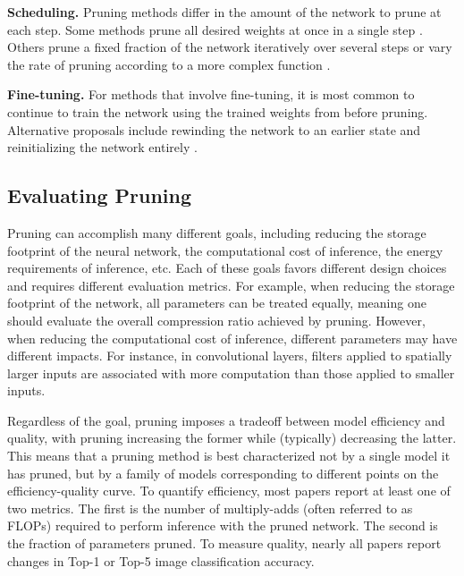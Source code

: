\textbf{Scheduling.}
Pruning methods differ in the amount of the network to prune at each step.
Some methods prune all desired weights at once in a single step \cite{rethinking-net-pruning}.
Others prune a fixed fraction of the network iteratively over several steps \cite{learning-both} or vary the rate of pruning according to a more complex function \cite{google-state-of-sparsity}.

\textbf{Fine-tuning.}
For methods that involve fine-tuning, it is most common to continue to train the network using the trained weights from before pruning.
Alternative proposals include rewinding the network to  an earlier state \cite{lottery-ticket-followup} and reinitializing the network entirely \cite{rethinking-net-pruning}.

\subsection{Evaluating Pruning}

Pruning can accomplish many different goals, including reducing the storage footprint of the neural network, the computational cost of inference, the energy requirements of inference, etc.
Each of these goals favors different design choices and requires different evaluation metrics.
For example, when reducing the storage footprint of the network, all parameters can be treated equally, meaning one should evaluate the overall compression ratio achieved by pruning.
However, when reducing the computational cost of inference, different parameters may have different impacts.
For instance, in convolutional layers, filters applied to spatially larger inputs are associated with more computation than those applied to smaller inputs.

Regardless of the goal, pruning imposes a tradeoff between model efficiency and quality, with pruning increasing the former while (typically) decreasing the latter. This means that a pruning method is best characterized not by a single model it has pruned, but by a family of models corresponding to different points on the efficiency-quality curve.
To quantify efficiency, most papers report at least one of two metrics. The first is the number of multiply-adds (often referred to as FLOPs) required to perform inference with the pruned network. The second is the fraction of parameters pruned. To measure quality, nearly all papers report changes in Top-1 or Top-5 image classification accuracy.

